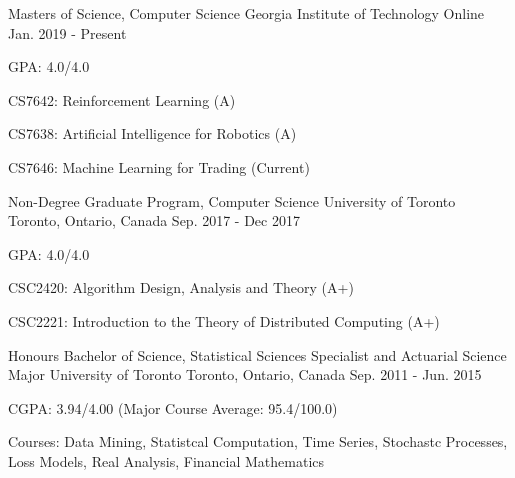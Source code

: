 
\begin{cventries}
  \cventry
    {Masters of Science, Computer Science} %
    {Georgia Institute of Technology} %
    {Online} %
    {Jan. 2019 - Present} %
    {GPA: 4.0/4.0\newline \hphantom{0}
      \begin{cvitems}
        \item {CS7642: Reinforcement Learning (A)}
        \item {CS7638: Artificial Intelligence for Robotics (A)}
        \item {CS7646: Machine Learning for Trading (Current)}
      \end{cvitems}
    }
\end{cventries}

\begin{cventries}
  \cventry
    {Non-Degree Graduate Program, Computer Science} %
    {University of Toronto} %
    {Toronto, Ontario, Canada} %
    {Sep. 2017 - Dec 2017} %
    {GPA: 4.0/4.0\newline \hphantom{0}
      \begin{cvitems}
        \item {CSC2420: Algorithm Design, Analysis and Theory (A+)}
        \item {CSC2221: Introduction to the Theory of Distributed Computing (A+)}
      \end{cvitems}
    }
\end{cventries}

\begin{cventries}
  \cventry
    {Honours Bachelor of Science, Statistical Sciences Specialist and Actuarial Science Major} %
    {University of Toronto} %
    {Toronto, Ontario, Canada} %
    {Sep. 2011 - Jun. 2015} %
    {CGPA: 3.94/4.00 (Major Course Average: 95.4/100.0)\newline \hphantom{0}
      \begin{cvitems}
        \item {Courses: Data Mining, Statistcal Computation, Time Series, Stochastc Processes, Loss Models, Real Analysis, Financial Mathematics}
      \end{cvitems}
    }
\end{cventries}
